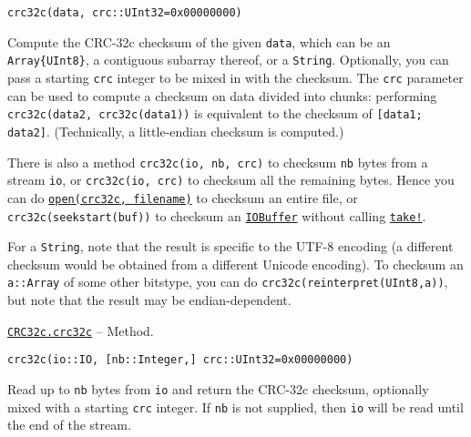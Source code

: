 \begin{adjustwidth}{2em}{0pt}


\begin{verbatim}
crc32c(data, crc::UInt32=0x00000000)
\end{verbatim}

Compute the CRC-32c checksum of the given \texttt{data}, which can be an \texttt{Array\{UInt8\}}, a contiguous subarray thereof, or a \texttt{String}.  Optionally, you can pass a starting \texttt{crc} integer to be mixed in with the checksum.  The \texttt{crc} parameter can be used to compute a checksum on data divided into chunks: performing \texttt{crc32c(data2, crc32c(data1))} is equivalent to the checksum of \texttt{[data1; data2]}. (Technically, a little-endian checksum is computed.)

There is also a method \texttt{crc32c(io, nb, crc)} to checksum \texttt{nb} bytes from a stream \texttt{io}, or \texttt{crc32c(io, crc)} to checksum all the remaining bytes. Hence you can do \hyperlink{300818094931158296}{\texttt{open(crc32c, filename)}} to checksum an entire file, or \texttt{crc32c(seekstart(buf))} to checksum an \hyperlink{15789326112236459498}{\texttt{IOBuffer}} without calling \hyperlink{4963355246106153560}{\texttt{take!}}.

For a \texttt{String}, note that the result is specific to the UTF-8 encoding (a different checksum would be obtained from a different Unicode encoding). To checksum an \texttt{a::Array} of some other bitstype, you can do \texttt{crc32c(reinterpret(UInt8,a))}, but note that the result may be endian-dependent.



\end{adjustwidth}
\hypertarget{2947862938473710782}{} 
\hyperlink{2947862938473710782}{\texttt{CRC32c.crc32c}}  -- {Method.}

\begin{adjustwidth}{2em}{0pt}


\begin{verbatim}
crc32c(io::IO, [nb::Integer,] crc::UInt32=0x00000000)
\end{verbatim}

Read up to \texttt{nb} bytes from \texttt{io} and return the CRC-32c checksum, optionally mixed with a starting \texttt{crc} integer.  If \texttt{nb} is not supplied, then \texttt{io} will be read until the end of the stream.



\end{adjustwidth}


